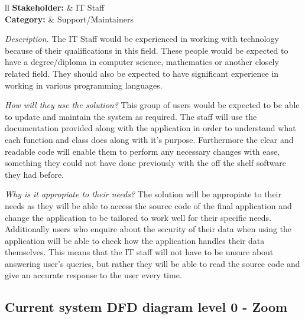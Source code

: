 \noindent
\begin{tblr}{ll}
  \textsf{\bfseries Stakeholder: } & IT Staff\\
  \textsf{\bfseries Category: } & Support/Maintainers\\
\end{tblr}
\vspace{0.2cm}

\textit{Description.}
The IT Staff would be experienced in working with technology
because of their qualifications in this field. These people 
would be expected to have a degree/diploma in computer science,
mathematics or another closely related field. They should also 
be expected to have significant experience in working in 
various programming languages. \vspace{0.2cm}

\textit{How will they use the solution?}
This group of users would be expected to be able to update and
maintain the system as required. The staff will use the
documentation provided along with the application in order to
understand what each function and class does along with it's
purpose. Furthermore the clear and readable code will enable
them to perform any necessary changes with ease, something
they could not have done previously with the off the shelf
software they had before. \vspace{0.2cm}

\textit{Why is it appropiate to their needs?}
The solution will be appropiate to their needs as they will be
able to access the source code of the final application and 
change the application to be tailored to work well for their 
specific needs. Additionally users who enquire about the 
security of their data when using the application will be able
to check how the application handles their data themselves.
This means that the IT staff will not have to be unsure about
answering user's queries, but rather they will be able to read
the source code and give an accurate response to the user every
time.

\subsection{Current system DFD diagram level 0 - Zoom}
\label{sec:currdfd}

